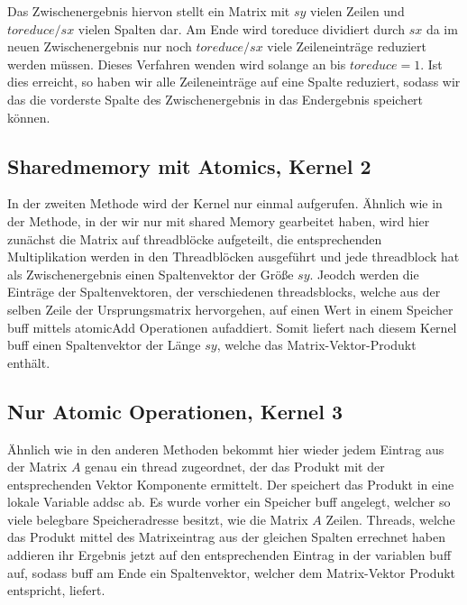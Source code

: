 \documentclass[10pt,a4paper]{article}
\begin{document}
	 Das Zwischenergebnis hiervon stellt ein Matrix mit $sy$ vielen Zeilen und $toreduce/sx$ vielen Spalten dar.
	 Am Ende wird toreduce dividiert durch $sx$ da im neuen Zwischenergebnis nur noch $toreduce/sx$ viele Zeileneinträge reduziert werden müssen. Dieses Verfahren wenden wird solange an bis $toreduce=1$. Ist dies erreicht, so haben wir alle Zeileneinträge auf eine Spalte reduziert, sodass wir das die vorderste Spalte des Zwischenergebnis in das Endergebnis speichert können.
	 \subsection{Sharedmemory mit Atomics, Kernel 2}
	 In der zweiten Methode wird der Kernel nur einmal aufgerufen. Ähnlich wie in der Methode, in der wir nur mit shared Memory gearbeitet haben, wird hier zunächst die Matrix auf threadblöcke aufgeteilt, die entsprechenden Multiplikation werden in den Threadblöcken ausgeführt und jede threadblock hat als Zwischenergebnis einen Spaltenvektor der Größe $sy$. Jeodch werden die Einträge der Spaltenvektoren, der verschiedenen threadsblocks, welche aus der selben Zeile der Ursprungsmatrix hervorgehen, auf einen Wert in einem Speicher buff mittels atomicAdd Operationen aufaddiert. Somit liefert nach diesem Kernel buff einen Spaltenvektor der Länge $sy$, welche das Matrix-Vektor-Produkt enthält.
	 \subsection{Nur Atomic Operationen, Kernel 3}
	 Ähnlich wie in den anderen Methoden bekommt hier wieder jedem Eintrag aus der Matrix $A$ genau ein thread zugeordnet, der das Produkt mit der entsprechenden Vektor Komponente ermittelt. Der speichert das Produkt in eine lokale Variable addsc ab. Es wurde vorher ein Speicher buff angelegt, welcher so viele belegbare Speicheradresse besitzt, wie die Matrix $A$ Zeilen. Threads, welche das Produkt mittel des Matrixeintrag aus der gleichen Spalten errechnet haben addieren ihr Ergebnis jetzt auf den entsprechenden Eintrag in der variablen buff auf, sodass buff am Ende ein Spaltenvektor, welcher dem Matrix-Vektor Produkt entspricht, liefert.
\end{document}
